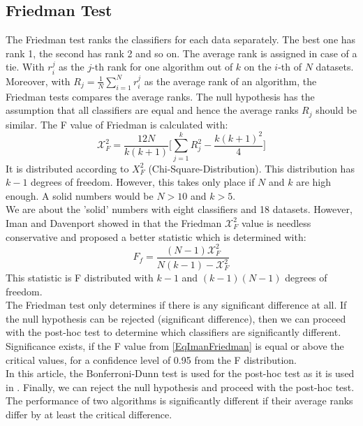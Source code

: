 \subsection{Friedman Test}
The Friedman test ranks the classifiers for each data separately. The best one has rank 1, the second has rank 2 and so on.
The average rank is assigned in case of a tie.
With $r_i^j$ as the $j$-th rank for one algorithm out of $k$ on the $i$-th of $N$ datasets.
Moreover, with $R_j = \frac{1}{N}\sum_{i=1}^{N}r_i^j$ as the average rank of an algorithm, the Friedman tests compares the average ranks.
The null hypothesis has the assumption that all classifiers are equal and hence the average ranks $R_j$ should be similar.
The F value of Friedman is calculated with:\cite[p. 11]{JanezDemsar.2006}
\begin{equation}\label{EqFriemanXF}
	\mathcal{X}_F^2 = \frac{12N}{k(k+1)}\Bigg[\sum_{j=1}^{k}R_j^2 - \frac{k(k+1)^2}{4} \Bigg]
\end{equation}
It is distributed according to $X_F^2$ (Chi-Square-Distribution).
This distribution has $k-1$ degrees of freedom. However, this takes only place if $N$ and $k$ are high enough.
A solid numbers would be $N>10$ and $k>5$.\cite[p. 11]{JanezDemsar.2006}\\ We are about the 'solid' numbers with eight classifiers and 18 datasets.
However, Iman and Davenport showed in \cite{RonaldL.Iman.} that the Friedman $\mathcal{X}_F^2$ value is needless conservative and proposed a better statistic which is determined with:\cite[p. 11]{JanezDemsar.2006}
\begin{equation}\label{EqImanFriedman}
	F_f= \frac{(N-1)\mathcal{X}_F^2}{N(k-1)-\mathcal{X}_F^2}
\end{equation}
This statistic is F distributed with $k-1$ and $(k-1)(N-1)$ degrees of freedom.\\
The Friedman test only determines if there is any significant difference at all. 
If the null hypothesis can be rejected (significant difference), then we can proceed with the post-hoc test to determine which classifiers are significantly different.
Significance exists, if the F value from \eqref{EqImanFriedman} is equal or above the critical values, for a confidence level of 0.95 from the F distribution.\cite[p.11]{JanezDemsar.2006}\\
In this article, the Bonferroni-Dunn test is used for the post-hoc test as it is used in \cite{Chen.2009}.
Finally, we can reject the null hypothesis and proceed with the post-hoc test.
The performance of two algorithms is significantly different if their average ranks differ by at least the critical difference. 
